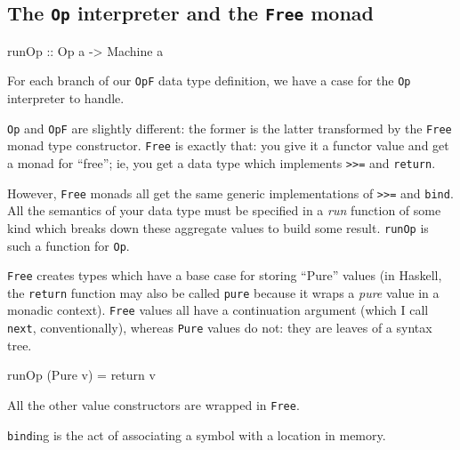 \documentclass[]{article}
\newenvironment{Shaded}{}{}
\newcommand{\DataTypeTok}[1]{\textcolor[rgb]{0.56,0.13,0.00}{{#1}}}
\newcommand{\OtherTok}[1]{\textcolor[rgb]{0.00,0.44,0.13}{{#1}}}
\newcommand{\FunctionTok}[1]{\textcolor[rgb]{0.02,0.16,0.49}{{#1}}}
\newcommand{\NormalTok}[1]{{#1}}
\begin{document}
\subsection{The \texttt{Op} interpreter and the \texttt{Free}
monad}\label{the-op-interpreter-and-the-free-monad}

\begin{Shaded}
\begin{Highlighting}[]
\OtherTok{runOp ::} \DataTypeTok{Op} \NormalTok{a }\OtherTok{->} \DataTypeTok{Machine} \NormalTok{a}
\end{Highlighting}
\end{Shaded}

For each branch of our \texttt{OpF} data type definition, we have a case
for the \texttt{Op} interpreter to handle.

\texttt{Op} and \texttt{OpF} are slightly different: the former is the
latter transformed by the \texttt{Free} monad type constructor.
\texttt{Free} is exactly that: you give it a functor value and get a
monad for ``free''; ie, you get a data type which implements
\texttt{\textgreater{}\textgreater{}=} and \texttt{return}.

However, \texttt{Free} monads all get the same generic implementations
of \texttt{\textgreater{}\textgreater{}=} and \texttt{bind}. All the
semantics of your data type must be specified in a \emph{run} function
of some kind which breaks down these aggregate values to build some
result. \texttt{runOp} is such a function for \texttt{Op}.

\texttt{Free} creates types which have a base case for storing ``Pure''
values (in Haskell, the \texttt{return} function may also be called
\texttt{pure} because it wraps a \emph{pure} value in a monadic
context). \texttt{Free} values all have a continuation argument (which I
call \texttt{next}, conventionally), whereas \texttt{Pure} values do
not: they are leaves of a syntax tree.

\begin{Shaded}
\begin{Highlighting}[]
\NormalTok{runOp (}\DataTypeTok{Pure} \NormalTok{v) }\FunctionTok{=} \NormalTok{return v}
\end{Highlighting}
\end{Shaded}

All the other value constructors are wrapped in \texttt{Free}.

\texttt{bind}ing is the act of associating a symbol with a location in
memory.
\end{document}
